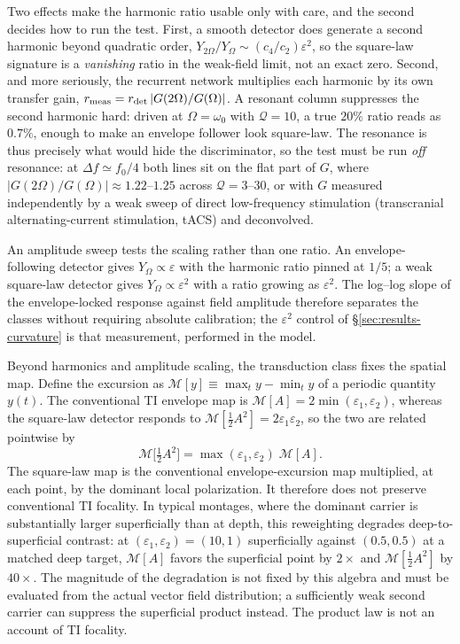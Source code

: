 \documentclass[11pt,a4paper]{article}
\newcommand{\half}{\tfrac{1}{2}}
\begin{document}
Two effects make the harmonic ratio usable only with care, and the second decides how to
run the test. First, a smooth detector does generate a second harmonic beyond quadratic
order, $Y_{2\Omega}/Y_\Omega\sim(c_4/c_2)\varepsilon^2$, so the square-law signature is a
\emph{vanishing} ratio in the weak-field limit, not an exact zero. Second, and more
seriously, the recurrent network multiplies each harmonic by its own transfer gain,
$r_{\rm meas}=r_{\rm det}\,|G(2\Omega)/G(\Omega)|$. A resonant column suppresses the second
harmonic hard: driven at $\Omega=\omega_0$ with $\mathcal{Q}=10$, a true $20\%$ ratio reads
as $0.7\%$, enough to make an envelope follower look square-law. The resonance is thus
precisely what would hide the discriminator, so the test must be run \emph{off} resonance:
at $\Delta f\simeq f_0/4$ both lines sit on the flat part of $G$, where
$|G(2\Omega)/G(\Omega)|\approx1.22$--$1.25$ across $\mathcal{Q}=3$--$30$, or with $G$
measured independently by a weak sweep of direct low-frequency stimulation (transcranial
alternating-current stimulation, tACS) and deconvolved.

An amplitude sweep tests the scaling rather than one ratio. An
envelope-following detector gives $Y_\Omega\propto\varepsilon$ with the harmonic ratio
pinned at $1/5$; a weak square-law detector gives $Y_\Omega\propto\varepsilon^2$ with a
ratio growing as $\varepsilon^2$. The log--log slope of the envelope-locked response
against field amplitude therefore separates the classes without requiring absolute
calibration; the $\varepsilon^2$ control of \S\ref{sec:results-curvature} is that
measurement, performed in the model.

Beyond harmonics and amplitude scaling, the transduction class fixes the spatial map.
Define the excursion as
$\mathcal{M}[y]\equiv\max_t y-\min_t y$ of a periodic quantity $y(t)$. The conventional TI envelope map is
$\mathcal{M}[A]=2\min(\varepsilon_1,\varepsilon_2)$, whereas the square-law detector
responds to $\mathcal{M}[\half A^2]=2\varepsilon_1\varepsilon_2$, so the two are related
pointwise by
\begin{equation}
\mathcal{M}\big[\tfrac12A^2\big]=\max(\varepsilon_1,\varepsilon_2)\;\mathcal{M}[A].
\label{eq:reweight}
\end{equation}
The square-law map is the conventional envelope-excursion map multiplied, at each point,
by the dominant local polarization. It therefore does not preserve conventional TI
focality. In typical montages, where the dominant carrier is substantially larger
superficially than at depth, this reweighting degrades deep-to-superficial contrast: at
$(\varepsilon_1,\varepsilon_2)=(10,1)$ superficially against $(0.5,0.5)$ at a matched
deep target, $\mathcal{M}[A]$ favors the superficial point by $2\times$ and
$\mathcal{M}[\half A^2]$ by $40\times$. The magnitude of the degradation is not fixed by
this algebra and must be evaluated from the actual vector field distribution; a
sufficiently weak second carrier can suppress the superficial product instead. The
product law is not an account of TI focality.
\end{document}

